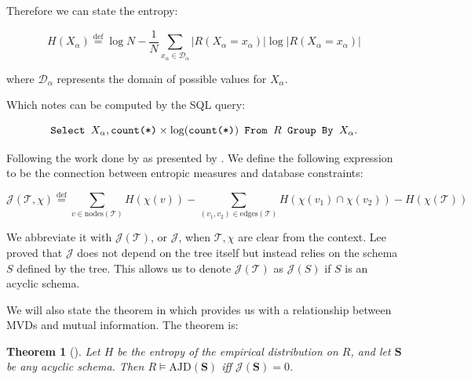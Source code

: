 \documentclass[logo,bsc,singlespacing,parskip,online]{infthesis}
\newtheorem{theorem}{Theorem}[section]
\begin{document}
Therefore we can state the entropy:

\begin{equation}
H(X_\alpha) \stackrel{\text{def}}{=} \log N - \frac{1}{N} \sum_{x_\alpha \in \mathcal{D}_\alpha} |R(X_\alpha = x_\alpha)| \log |R(X_\alpha = x_\alpha)|
\end{equation}

where $\mathcal{D}_\alpha$ represents the domain of possible values for $X_\alpha$.

Which \citet{DBLP:conf/sigmod/KenigMPSS20} notes can be computed by the SQL query:

\begin{equation*}
\text{\texttt{Select }} X_\alpha, \text{\texttt{count(*)}} \times \log(\text{\texttt{count(*)}}) \text{\texttt{ From }} R \text{\texttt{ Group By }} X_\alpha.
\end{equation*}

Following the work done by \citet{DBLP:journals/tse/Lee87,DBLP:journals/tse/Lee87a} as presented by \citet{DBLP:conf/sigmod/KenigMPSS20}. We define the following expression to be the connection between entropic measures and database constraints:

\setcounter{equation}{5}
\begin{equation}
  \mathcal{J}(\mathcal{T}, \chi) \stackrel{\mathrm{def}}{=}
    \sum_{v \in \mathrm{nodes}(\mathcal{T})} H(\chi(v))
    - \sum_{(v_1,v_2) \in \mathrm{edges}(\mathcal{T})}
        H(\chi(v_1) \cap \chi(v_2))
    - H(\chi(\mathcal{T}))
  \label{eq:J}
\end{equation}

We abbreviate it with $\mathcal{J}(\mathcal{T})$, or $\mathcal{J}$, when $\mathcal{T}, \chi$ are clear from the context. Lee proved that $\mathcal{J}$ does not depend on the tree itself but instead relies on the schema $S$ defined by the tree. This allows us to denote $\mathcal{J}(\mathcal{T})$ as $\mathcal{J}(S)$ if $S$ is an acyclic schema.

We will also state the theorem in \citet{DBLP:conf/sigmod/KenigMPSS20} which provides us with a relationship between MVDs and mutual information. The theorem is:

\begin{theorem}[\citep{DBLP:journals/tse/Lee87a}]\label{thm:lee}
Let $H$ be the entropy of the empirical distribution on $R$, and let
$\mathbf{S}$ be any acyclic schema. Then
$R \models \mathrm{AJD}(\mathbf{S})$ iff $\mathcal{J}(\mathbf{S}) = 0$.
\end{theorem}
\end{document}
